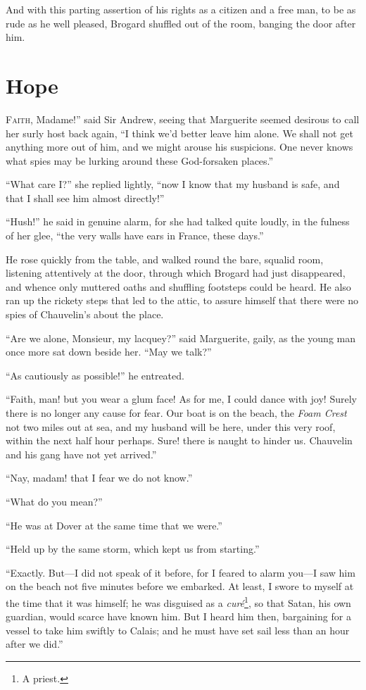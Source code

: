 \documentclass[paper=a5,BCOR=7mm,twoside,DIV=calc,12pt,usegeometry,chapterprefix,endperiod,headings=big]{scrbook}
\begin{document}
And with this parting assertion of his rights as a citizen and a free man, to be as rude as he well pleased, Brogard shuffled out of the room, banging the door after him.

\chapter{Hope}
\lettrine[ante=``,lines=4]{F}{aith}, Madame!'' said Sir Andrew, seeing that Marguerite seemed desirous to call her surly host back again, \enquote{I think we'd better leave him alone. We shall not get anything more out of him, and we might arouse his suspicions. One never knows what spies may be lurking around these God-forsaken places.}

\enquote{What care I?} she replied lightly, \enquote{now I know that my husband is safe, and that I shall see him almost directly!}

\enquote{Hush!} he said in genuine alarm, for she had talked quite loudly, in the fulness of her glee, \enquote{the very walls have ears in France, these days.}

He rose quickly from the table, and walked round the bare, squalid room, listening attentively at the door, through which Brogard had just disappeared, and whence only muttered oaths and shuffling footsteps could be heard. He also ran up the rickety steps that led to the attic, to assure himself that there were no spies of Chauvelin's about the place.

\enquote{Are we alone, Monsieur, my lacquey?} said Marguerite, gaily, as the young man once more sat down beside her. \enquote{May we talk?}

\enquote{As cautiously as possible!} he entreated.

\enquote{Faith, man! but you wear a glum face! As for me, I could dance with joy! Surely there is no longer any cause for fear. Our boat is on the beach, the \textit{Foam Crest} not two miles out at sea, and my husband will be here, under this very roof, within the next half hour perhaps. Sure! there is naught to hinder us. Chauvelin and his gang have not yet arrived.}

\enquote{Nay, madam! that I fear we do not know.}

\enquote{What do you mean?}

\enquote{He was at Dover at the same time that we were.}

\enquote{Held up by the same storm, which kept us from starting.}

\enquote{Exactly. But---I did not speak of it before, for I feared to alarm you---I saw him on the beach not five minutes before we embarked. At least, I swore to myself at the time that it was himself; he was disguised as a \textit{curé}\footnote{A priest.}, so that Satan, his own guardian, would scarce have known him. But I heard him then, bargaining for a vessel to take him swiftly to Calais; and he must have set sail less than an hour after we did.}
\end{document}
